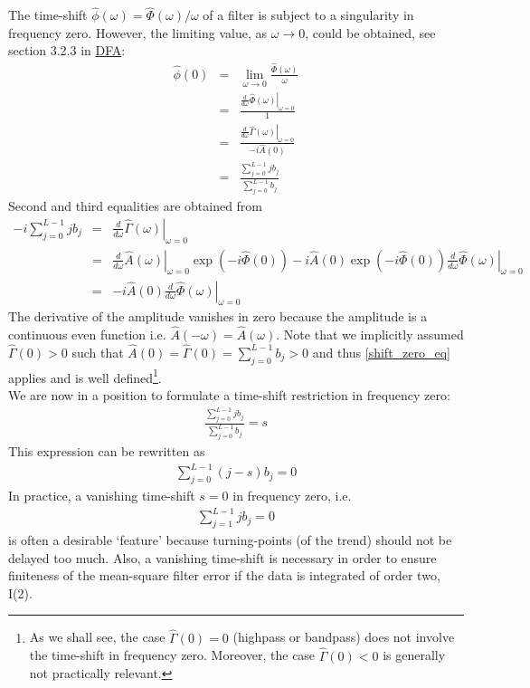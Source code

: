 \documentclass[a4paper]{book}
\begin{document}
The time-shift $\hat{\phi}(\omega)=\hat{\Phi}(\omega)/\omega$ of a filter is subject to a singularity in frequency zero. However, the limiting value, as $\omega\to 0$, could be obtained, see section 3.2.3 in \href{http://blog.zhaw.ch/sef/files/2014/10/DFA.pdf}{DFA}:
\begin{eqnarray}
\hat{\phi}(0)&=&\lim_{\omega\to 0}\frac{\hat{\Phi}(\omega)}{\omega}\nonumber\\
&=&\frac{\left.\frac{d}{d\omega}\hat{\Phi}(\omega)\right |_{\omega=0}}{1}\nonumber\\
&=&\frac{\left.\frac{d}{d\omega}\hat{\Gamma}(\omega)\right|_{\omega=0}}{-i\hat{A}(0)}\nonumber\\
&=&\frac{\sum_{j=0}^{L-1}jb_j}{\sum_{j=0}^{L-1}b_j}\label{shift_zero_eq}
\end{eqnarray}
Second and third equalities are obtained from
\begin{eqnarray*}
-i\sum_{j=0}^{L-1}jb_j&=&\left.\frac{d}{d\omega}\hat{\Gamma}(\omega)\right |_{\omega=0}\\
&=&\left.\frac{d}{d\omega}\hat{A}(\omega)\right |_{\omega=0}
\exp(-i\hat{\Phi}(0))-i\hat{A}(0)\exp(-i\hat{\Phi}(0))\left.\frac{d}{d\omega}\hat{\Phi}(\omega)\right |_{\omega=0}\\
&=&-i \hat{A}(0)\left.\frac{d}{d\omega}\hat{\Phi}(\omega)\right |_{\omega=0}
\end{eqnarray*}
The derivative of the amplitude vanishes in zero because the amplitude is a continuous even function
i.e. $\hat{A}(-\omega)=\hat{A}(\omega)$. Note that we implicitly assumed $\hat{\Gamma}(0)>0$ such that $\hat{A}(0)=\hat{\Gamma}(0)=\sum_{j=0}^{L-1}b_j>0$ and thus \ref{shift_zero_eq} applies and is well defined\footnote{As we shall see, the case $\hat{\Gamma}(0)=0$ (highpass or bandpass) does not involve the time-shift in frequency zero. Moreover, the case $\hat{\Gamma}(0)<0$ is generally not practically relevant.}.\\

We are now in a position to formulate a time-shift restriction in frequency zero:
\begin{eqnarray*}
\frac{\sum_{j=0}^{L-1}jb_j}{\sum_{j=0}^{L-1}b_j}=s
\end{eqnarray*}
This expression can be rewritten as
\begin{eqnarray}
\sum_{j=0}^{L-1}(j-s)b_j =0\label{shift_zero_eq_general}
\end{eqnarray}
In practice, a vanishing time-shift $s=0$ in frequency zero, i.e. 
\begin{eqnarray*}
\sum_{j=1}^{L-1}jb_j=0
\end{eqnarray*}
is often a desirable `feature' because turning-points (of the trend) should not be delayed too much. Also, a vanishing time-shift is necessary in order to ensure finiteness of the mean-square filter error if the data is integrated of order two, I(2). 
\end{document}
